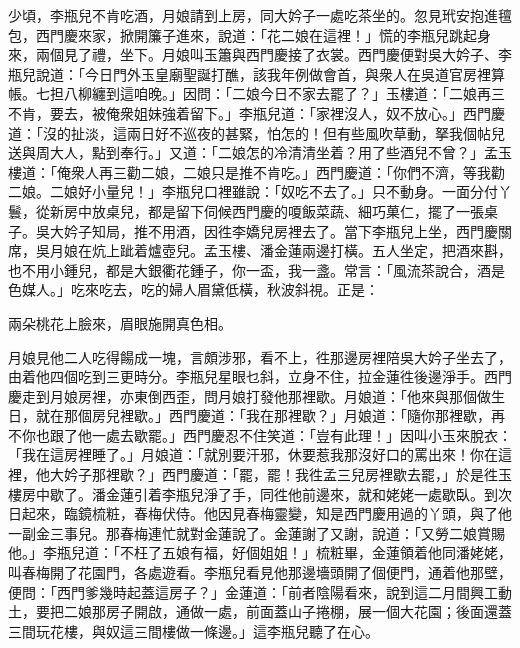 少頃，李瓶兒不肯吃酒，月娘請到上房，同大妗子一處吃茶坐的。忽見玳安抱進氊包，西門慶來家，掀開簾子進來，說道：「花二娘在這裡！」慌的李瓶兒跳起身來，兩個見了禮，坐下。月娘叫玉簫與西門慶接了衣裳。西門慶便對吳大妗子、李瓶兒說道：「今日門外玉皇廟聖誕打醮，該我年例做會首，與衆人在吳道官房裡算帳。七担八柳纏到這咱晚。」因問：「二娘今日不家去罷了？」玉樓道：「二娘再三不肯，要去，被俺衆姐妹強着留下。」李瓶兒道：「家裡沒人，奴不放心。」西門慶道：「沒的扯淡，這兩日好不巡夜的甚緊，怕怎的！但有些風吹草動，拏我個帖兒送與周大人，點到奉行。」又道：「二娘怎的冷清清坐着？{}{}用了些酒兒不曾？」孟玉樓道：「俺衆人再三勸二娘，二娘只是推不肯吃。」西門慶道：「你們不濟，等我勸二娘。二娘好小量兒！」{}李瓶兒口裡雖說：「奴吃不去了。」只不動身。一面分付丫鬟，從新房中放桌兒，都是留下伺候西門慶的嗄飯菜蔬、細巧菓仁，擺了一張桌子。吳大妗子知局，推不用酒，因徃李嬌兒房裡去了。{}當下李瓶兒上坐，西門慶關席，吳月娘在炕上跐着爐壺兒。{}孟玉樓、潘金蓮兩邊打橫。五人坐定，把酒來斟，也不用小鍾兒，都是大銀衢花鍾子，你一盃，我一盞。常言：「風流茶說合，酒是色媒人。」吃來吃去，吃的婦人眉黛低橫，秋波斜視。{}正是：

\begin{myquote}
兩朵桃花上臉來，眉眼施開真色相。
\end{myquote}

月娘見他二人吃得餳成一塊，言頗涉邪，看不上，{}徃那邊房裡陪吳大妗子坐去了，由着他四個吃到三更時分。李瓶兒星眼乜斜，立身不住，拉金蓮徃後邊淨手。西門慶走到月娘房裡，亦東倒西歪，問月娘打發他那裡歇。月娘道：「他來與那個做生日，就在那個房兒裡歇。」西門慶道：「我在那裡歇？」{}月娘道：「隨你那裡歇，再不你也跟了他一處去歇罷。」西門慶忍不住笑道：「豈有此理！」因叫小玉來脫衣：「我在這房裡睡了。」{}月娘道：「就別要汗邪，休要惹我那沒好口的罵出來！你在這裡，他大妗子那裡歇？」西門慶道：「罷，罷！{}我徃孟三兒房裡歇去罷，」於是徃玉樓房中歇了。潘金蓮引着李瓶兒淨了手，同徃他前邊來，就和姥姥一處歇臥。到次日起來，臨鏡梳粧，春梅伏侍。他因見春梅靈變，知是西門慶用過的丫頭，與了他一副金三事兒。{}那春梅連忙就對金蓮說了。金蓮謝了又謝，說道：「又勞二娘賞賜他。」李瓶兒道：「不枉了五娘有福，好個姐姐！」梳粧畢，金蓮領着他同潘姥姥，叫春梅開了花園門，各處遊看。李瓶兒看見他那邊墻頭開了個便門，通着他那壁，便問：「西門爹幾時起蓋這房子？」金蓮道：「前者陰陽看來，說到這二月間興工動土，要把二娘那房子開啟，通做一處，前面蓋山子捲棚，展一個大花園；後面還蓋三間玩花樓，與奴這三間樓做一條邊。」這李瓶兒聽了在心。

